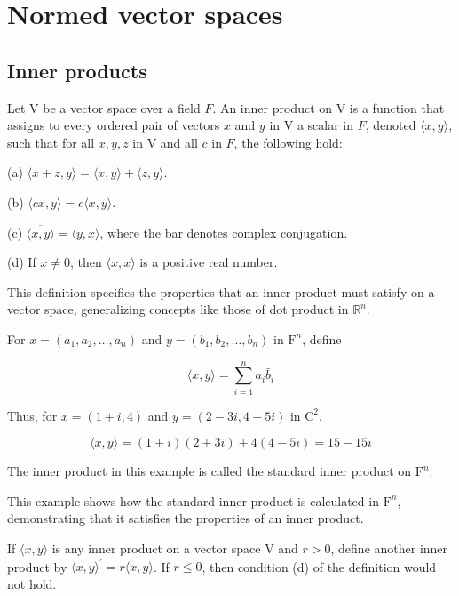 \documentclass{report}
\begin{document}
    \chapter{Normed vector spaces}

    \section{Inner products}
    \begin{defBox}
        Let $\mathrm{V}$ be a vector space over a field $F$. An inner product on $\mathrm{V}$ is a function that assigns to every ordered pair of vectors $x$ and $y$ in $\mathrm{V}$ a scalar in $F$, denoted $\langle x, y\rangle$, such that for all $x, y, z$ in $\mathrm{V}$ and all $c$ in $F$, the following hold:

        (a) $\langle x+z, y\rangle=\langle x, y\rangle+\langle z, y\rangle$.

        (b) $\langle c x, y\rangle=c\langle x, y\rangle$.

        (c) $\overline{\langle x, y\rangle}=\langle y, x\rangle$, where the bar denotes complex conjugation.

        (d) If $x \neq 0$, then $\langle x, x\rangle$ is a positive real number.
    \end{defBox}

    This definition specifies the properties that an inner product must satisfy on a vector space, generalizing concepts like those of dot product in $\mathbb{R}^n$.


    \begin{Example}
        For $x=\left(a_{1}, a_{2}, \ldots, a_{n}\right)$ and $y=\left(b_{1}, b_{2}, \ldots, b_{n}\right)$ in $\mathrm{F}^{n}$, define

        $$
        \langle x, y\rangle=\sum_{i=1}^{n} a_{i} \bar{b}_{i}
        $$

        Thus, for $x=(1+i, 4)$ and $y=(2-3 i, 4+5 i)$ in $\mathrm{C}^{2}$,

        $$
        \langle x, y\rangle=(1+i)(2+3 i)+4(4-5 i)=15-15 i
        $$

        The inner product in this example is called the standard inner product on $\mathrm{F}^{n}$.
    \end{Example}

    This example shows how the standard inner product is calculated in $\mathrm{F}^{n}$, demonstrating that it satisfies the properties of an inner product.


    \begin{Example}
        If $\langle x, y\rangle$ is any inner product on a vector space $\mathrm{V}$ and $r>0$, define another inner product by $\langle x, y\rangle^{\prime}=r\langle x, y\rangle$. If $r \leq 0$, then condition (d) of the definition would not hold.
    \end{Example}
\end{document}
